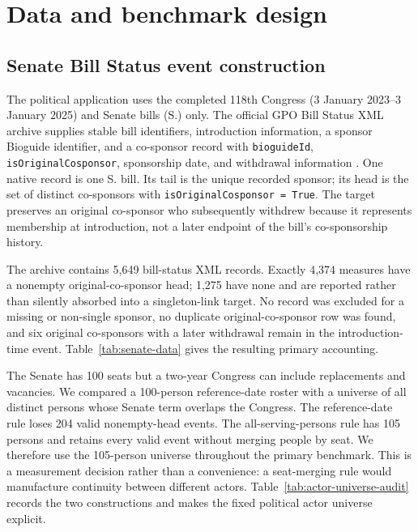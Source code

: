 \documentclass{nws}
\begin{document}
\section{Data and benchmark design}\label{sec:data-methods}

\subsection{Senate Bill Status event construction}\label{sec:senate-data}

The political application uses the completed 118th Congress (3 January 2023--3 January 2025) and Senate bills (S.) only. The official GPO Bill Status XML archive supplies stable bill identifiers, introduction information, a sponsor Bioguide identifier, and a co-sponsor record with \texttt{bioguideId}, \texttt{isOriginalCosponsor}, sponsorship date, and withdrawal information \citep{gpoBillStatus,congressGovBillStatus}. One native record is one S. bill. Its tail is the unique recorded sponsor; its head is the set of distinct co-sponsors with \texttt{isOriginalCosponsor = True}. The target preserves an original co-sponsor who subsequently withdrew because it represents membership at introduction, not a later endpoint of the bill's co-sponsorship history.

The archive contains 5,649 bill-status XML records. Exactly 4,374 measures have a nonempty original-co-sponsor head; 1,275 have none and are reported rather than silently absorbed into a singleton-link target. No record was excluded for a missing or non-single sponsor, no duplicate original-co-sponsor row was found, and six original co-sponsors with a later withdrawal remain in the introduction-time event. Table~\ref{tab:senate-data} gives the resulting primary accounting.




The Senate has 100 seats but a two-year Congress can include replacements and vacancies. We compared a 100-person reference-date roster with a universe of all distinct persons whose Senate term overlaps the Congress. The reference-date rule loses 204 valid nonempty-head events. The all-serving-persons rule has 105 persons and retains every valid event without merging people by seat. We therefore use the 105-person universe throughout the primary benchmark. This is a measurement decision rather than a convenience: a seat-merging rule would manufacture continuity between different actors. Table~\ref{tab:actor-universe-audit} records the two constructions and makes the fixed political actor universe explicit.
\end{document}
